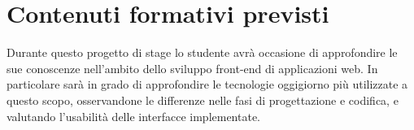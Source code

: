 \section*{Contenuti formativi previsti}
Durante questo progetto di stage lo studente avrà occasione di approfondire le sue conoscenze nell'ambito dello sviluppo front-end di applicazioni web. In particolare sarà in grado di approfondire le tecnologie oggigiorno più utilizzate a questo scopo, osservandone le differenze nelle fasi di progettazione e codifica, e valutando l'usabilità delle interfacce implementate.
\newpage